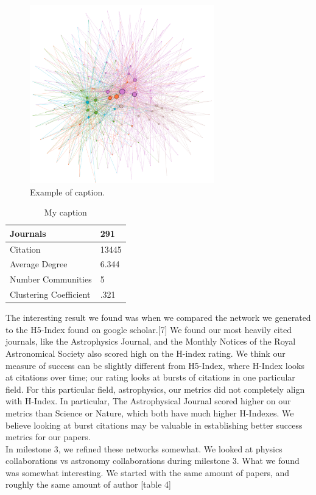 \documentclass[times, 10pt,twocolumn]{article}
\begin{document}
\begin{figure}[h]
   \includegraphics[width=8cm]{figure3.png}
   \caption{Example of caption.}
\end{figure}

\begin{table}[h]
\centering
\caption{My caption}
\label{my-label}
\begin{tabular}{|l|l|}
\hline
Journals               & 291   \\ \hline
Citation               & 13445 \\ \hline
Average Degree         & 6.344 \\ \hline
Number Communities     & 5     \\ \hline
Clustering Coefficient & .321  \\ \hline
\end{tabular}
\end{table}

The interesting result we found was when we compared the network we generated to the H5-Index found on google scholar.[7] We found our most heavily cited journals, like the Astrophysics Journal, and the Monthly Notices of the Royal Astronomical Society also scored high on the H-index rating. We think our measure of success can be slightly different from H5-Index, where H-Index looks at citations over time; our rating looks at bursts of citations in one particular field. For this particular field, astrophysics, our metrics did not completely align with H-Index. In particular, The Astrophysical Journal scored higher on our metrics than Science or Nature, which both have much higher H-Indexes. We believe looking at burst citations may be valuable in establishing better success metrics for our papers.\\

In milestone 3, we refined these networks somewhat. We looked at physics collaborations vs astronomy collaborations during milestone 3. What we found was somewhat interesting. We started with the same amount of papers, and roughly the same amount of author [table 4] \\
\end{document}
